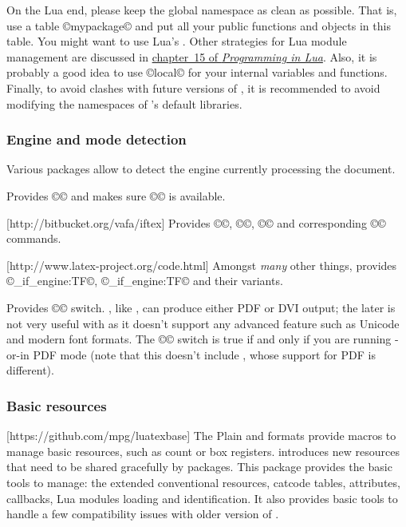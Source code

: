 \documentclass{lltxdoc}
\begin{document}
On the Lua end, please keep the global namespace as clean as possible. That
is, use a table ©mypackage© and put all your public functions and objects in
this table. You might want to use Lua's
\href{http://www.lua.org/manual/5.1/manual.html#pdf-module} {}.
Other strategies for Lua module management are discussed in
\href{http://www.lua.org/pil/15.html} {chapter~15 of \emph{Programming in
    Lua}}.  Also, it is probably a good idea to use ©local© for your internal
variables and functions. Finally, to avoid clashes with future versions of
\luatex, it is recommended to avoid modifying the namespaces of \luatex's
default libraries.

\subsubsection{Engine and mode detection}\label{detect}

Various packages allow to detect the engine currently processing the document.

Provides ©\ifluatex© and makes sure ©\luatexversion© is available.

[http://bitbucket.org/vafa/iftex]
Provides ©\ifPDFTeX©, ©\ifXeTeX©, ©\ifLuaTeX© and corresponding ©\Require©
commands.

[http://www.latex-project.org/code.html]
Amongst \emph{many} other things, provides ©\luatex_if_engine:TF©,
©\xetex_if_engine:TF© and their variants.

Provides ©\ifpdf© switch. \luatex, like \pdftex, can produce either PDF or DVI
output; the later is not very useful with \luatex as it doesn't support any
advanced feature such as Unicode and modern font formats. The ©\ifpdf© switch
is true if and only if you are running \pdftex-or-\luatex in PDF mode (note
that this doesn't include \xetex, whose support for PDF is different).

\subsubsection{Basic resources}

[https://github.com/mpg/luatexbase]
The Plain and \latex formats provide macros to manage \tex basic resources,
such as count or box registers. \luatex introduces new resources that need to
be shared gracefully by packages. This package provides the basic tools to
manage: the extended conventional \tex resources, catcode tables, attributes,
callbacks, Lua modules loading and identification. It also provides basic
tools to handle a few compatibility issues with older version of \luatex.
\end{document}
